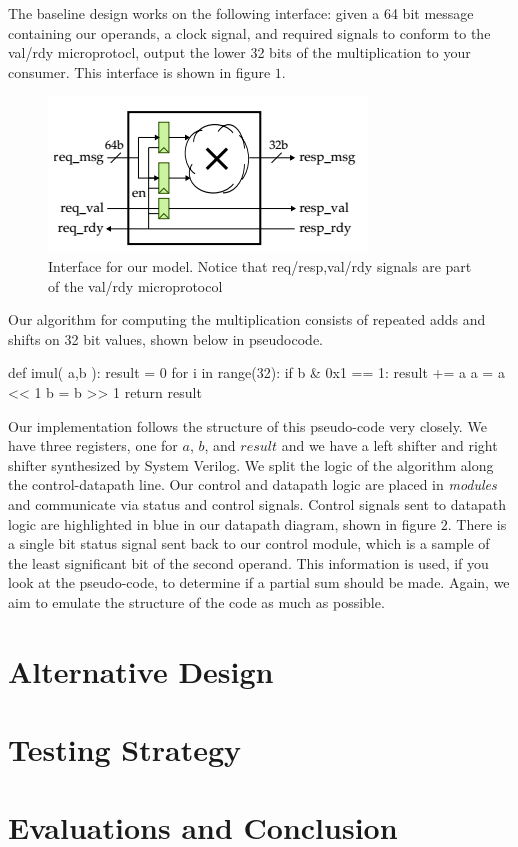 \documentclass[11pt,twocolumn]{article}
\begin{document}
The baseline design works on the following interface: given a 64 bit message containing our operands, a clock signal,
and required signals to conform to the val/rdy microprotocl, output the lower 32 bits of the multiplication to your consumer.
This interface is shown in figure $1$.
\begin{figure}[b]
\centering
\includegraphics[scale=0.5]{FLmodel}
\caption{Interface for our model. Notice that req/resp,val/rdy signals are part of the val/rdy microprotocol}
\end{figure}
Our algorithm for computing the multiplication consists of repeated adds and shifts on 32 bit values, shown below in pseudocode.
\begin{python}
def imul( a,b ):
    result = 0
    for i in range(32):
        if b & 0x1 == 1:
            result += a
        a = a << 1
        b = b >> 1
    return result
\end{python}
Our implementation follows the structure of this pseudo-code very closely. We have three registers, one for $a$, $b$, and $result$ and we have 
a left shifter and right shifter synthesized by System Verilog. 
We split the logic of the algorithm along the control-datapath line. Our control and datapath logic are placed in \textit{modules} and communicate
via status and control signals. Control signals sent to datapath logic are highlighted in blue in our datapath diagram, shown in figure $2$. 
There is a single bit status signal sent back to our control module, which is a sample of the least significant bit of the second operand.
This information is used, if you look at the pseudo-code, to determine if a partial sum should be made. Again, we aim to emulate the structure of the code as much as possible.   
 

\section{Alternative Design}

\section{Testing Strategy}

\section{Evaluations and Conclusion}
\end{document}
